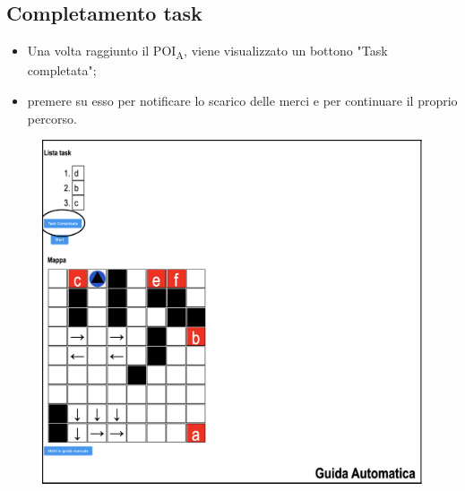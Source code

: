\subsection{Completamento task}
\begin{itemize}
    \item Una volta raggiunto il POI\textsubscript{A}, viene visualizzato un bottono "Task completata";
    \item premere su esso per notificare lo scarico delle merci e per continuare il proprio percorso.
\end{itemize}
\begin{figure}[H]
    \centering
    \includegraphics[scale=0.45]{res/images/forklift_taskcompletata.png}
\end{figure}
\pagebreak
